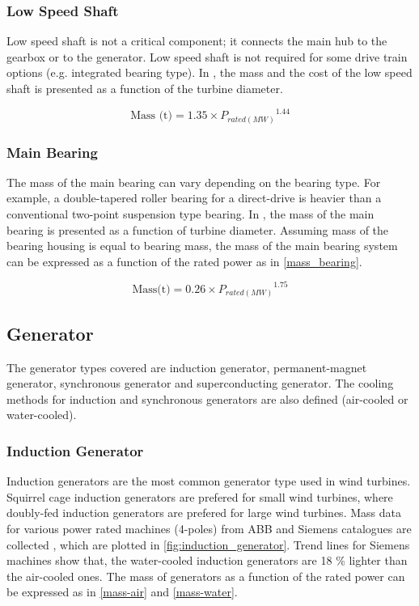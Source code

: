 \documentclass{article}\usepackage{graphicx, color}
\begin{document}
\subsubsection{Low Speed Shaft}
Low speed shaft is not a critical component; it connects the main hub to the gearbox or to the generator. Low speed shaft is not required for some drive train options (e.g. integrated bearing type). In \cite{Fingersh2006}, the mass and the cost of the low speed shaft is presented as a function of the turbine diameter.

\begin{equation}
		\text{Mass (t)} = 1.35 \times {P_{rated(MW)}}^{1.44}
\end{equation}

\subsubsection{Main Bearing}

The mass of the main bearing can vary depending on the bearing type. For example, a double-tapered roller bearing for a direct-drive is heavier than a conventional two-point suspension type bearing. In  \cite{Fingersh2006}, the mass of the main bearing is presented as a function of turbine diameter. Assuming mass of the bearing housing is equal to bearing mass, the mass of the main bearing system can be expressed as a function of the rated power as in \autoref{mass_bearing}.

\begin{equation}
	\text{Mass(t)} = 0.26 \times {P_{rated(MW)}}^{1.75}
  \label{mass_bearing}
\end{equation}

\subsection{Generator}

The generator types covered are induction generator, permanent-magnet generator, synchronous generator and superconducting generator. The cooling methods for induction and synchronous generators are also defined (air-cooled or water-cooled). 

\subsubsection{Induction Generator}

Induction generators are the most common generator type used in wind turbines. Squirrel cage induction generators are prefered for small wind turbines, where doubly-fed induction generators are prefered for large wind turbines. Mass data for various power rated machines (4-poles) from ABB and Siemens catalogues are collected \cite{ABB2012a, Siemens}, which are plotted in \autoref{fig:induction_generator}. Trend lines for Siemens machines show that, the water-cooled induction generators are 18 \% lighter than the air-cooled ones. The mass of generators as a function of the rated power can be expressed as in \autoref{mass-air} and \autoref{mass-water}.
\end{document}
